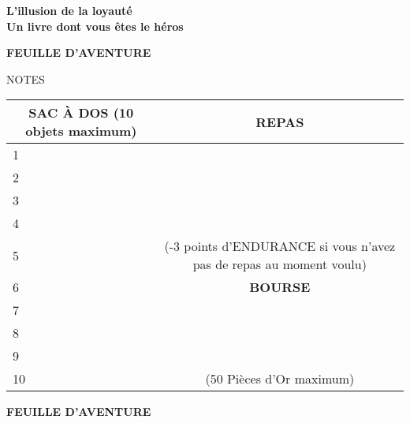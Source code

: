 \documentclass[10pt]{book}
\begin{document}
\frontmatter

\begin{titlepage}
    \begin{center}
        \textbf{\huge L'illusion de la loyauté}\\[0.5cm]
        \textbf{\large Un livre dont vous êtes le héros}\\[2cm]
    \end{center}
\end{titlepage}

\begin{center}
  \textbf{FEUILLE D'AVENTURE}
\end{center}
NOTES
\vspace{5.7cm}

{
  \renewcommand\arraystretch{1.8}
  \begin{tabular}{|ll|c|}
    \hline
    \multicolumn{2}{|c|}{\textbf{SAC À DOS} {\scriptsize(10 objets maximum)}}& \textbf{REPAS}\\ \hline
    1& & \\ \cline{1-2}
    2& & \\ \cline{1-2}
    3& & \\ \cline{1-2}
    4& & \\ \cline{1-2}
    5& & \multirow{-2}{3.6cm}{\scriptsize(-3 points d'ENDURANCE si vous n'avez pas de repas au moment voulu)}\\ \hline
    6& & \textbf{BOURSE}\\ \hline
    7& & \\ \cline{1-2}
    8& & \\ \cline{1-2}
    9& & \\ \cline{1-2}
    10& & \multirow{-1}{3.6cm}{\scriptsize(50 Pièces d'Or maximum)}\\ \hline
  \end{tabular}
}

\begin{center}
  \textbf{FEUILLE D'AVENTURE}
\end{center}

\hspace{0.4cm}
\end{document}
